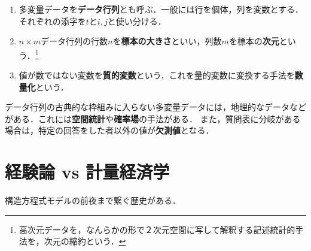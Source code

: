 \documentclass[uplatex,dvipdfmx]{jsreport}
\begin{document}
\begin{definition}\mbox{}
    \begin{enumerate}
        \item 多変量データを\textbf{データ行列}とも呼ぶ．一般には行を個体，列を変数とする．それぞれの添字を$t$と$i,j$と使い分ける．
        \item $n\times m$データ行列の行数$n$を\textbf{標本の大きさ}といい，列数$m$を標本の\textbf{次元}という．\footnote{高次元データを，なんらかの形で２次元空間に写して解釈する記述統計的手法を，次元の縮約という．}
        \item 値が数ではない変数を\textbf{質的変数}という．これを量的変数に変換する手法を\textbf{数量化}という．
    \end{enumerate}
\end{definition}
\begin{remark}
    データ行列の古典的な枠組みに入らない多変量データには，地理的なデータなどがある．これには\textbf{空間統計}や\textbf{確率場}の手法がある．
    また，質問表に分岐がある場合は，特定の回答をした者以外の値が\textbf{欠測値}となる．
\end{remark}

\section{経験論 vs 計量経済学}

\begin{tcolorbox}[colframe=ForestGreen, colback=ForestGreen!10!white,breakable,colbacktitle=ForestGreen!40!white,coltitle=black,fonttitle=\bfseries\sffamily,
title=]
    構造方程式モデルの前夜まで繋ぐ歴史がある．
\end{tcolorbox}
\end{document}
